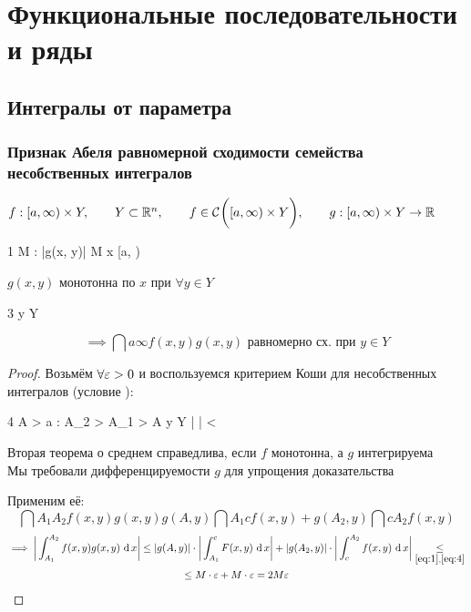 \chapter{Функциональные последовательности и ряды}

\section{Интегралы от параметра}

\subsection{Признак Абеля равномерной сходимости семейства несобственных интегралов}

\begin{theorem}
	$ f : [a, \infty) \times Y, \qquad Y \subset \mathbb{R}^n, \qquad f \in \mathcal{C}^{} \bigg( {[a, \infty) \times Y} \bigg) , \qquad g : [a, \infty) \times Y \to \mathbb{R} $
	\begin{equ}1
		\exist M : \quad |g(x, y)| \le M \quad \forall x \in [a, \infty)
	\end{equ}
	$ g(x, y) $ монотонна по $ x $ при $ \forall y \in Y $
	\begin{equ}3
		  y \in Y
	\end{equ}
	$$ \implies \dint{a}\infty{f(x, y)g(x, y)} \text{ равномерно сх. при } y \in Y $$
\end{theorem}

\begin{proof}
	Возьмём $ \forall \varepsilon > 0 $ и воспользуемся критерием Коши для несобственных интегралов (условие ):
	\begin{equ}4
		\exist A > a : \quad \forall A_2 > A_1 > A \quad \forall y \in Y \quad \bigg|  \bigg| < \veps
	\end{equ}
	\begin{statement}
		Вторая теорема о среднем справедлива, если $ f $ монотонна, а $ g $ интегрируема \\
		Мы требовали дифференцируемости $ g $ для упрощения доказательства
	\end{statement}
	Применим её:
	$$ \dint{A_1}{A_2}{f(x, y)g(x, y)} g(A, y) \dint{A_1}c{f(x, y)} + g(A_2, y)\dint{c}{A_2}{f(x, y)} $$
	\begin{multline*}
		\implies \bigg| \dint{A_1}{A_2}{f(x, y)g(x, y)} \bigg| \le |g(A, y)| \cdot \bigg| \dint{A_1}c{F(x, y)} \bigg| + |g(A_2, y)| \cdot \bigg| \dint{c}{A_2}{f(x, y)}\bigg| \underset{\eref1, \eref4}\le \\
		\le M \cdot \veps + M \cdot \veps = 2M\veps
	\end{multline*}
\end{proof}

